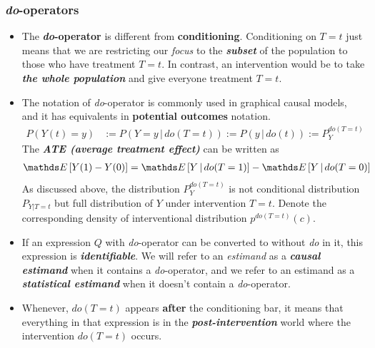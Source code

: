 \documentclass[11pt]{article}
\begin{document}
\subsubsection{\emph{do}-operators}
\begin{itemize}
\item   The \textbf{\emph{do}-operator} is different from \textbf{conditioning}. Conditioning on $T = t$ just means that we are restricting our \emph{focus} to the \emph{\textbf{subset}} of the population to those who have treatment $T=t$. In contrast, an intervention would be to take \textbf{\emph{the whole population}} and give everyone treatment $T=t$.

\item The notation of \emph{do}-operator is commonly used in graphical causal models, and it has equivalents in \textbf{potential outcomes} notation.
\begin{align}
P(Y(t) = y) &:= P(Y = y \,|\, do(T = t)) := P(y \,|\, do(t)) := P_{Y}^{do(T=t)}  \label{eqn: do_dist}
\end{align} The \textbf{\emph{ATE (average treatment effect)}} can be written as 
\begin{align}
\E{}{Y(1) - Y(0)} &= \E{}{Y\,|\, do(T=1)} -  \E{}{Y\,|\, do(T=0)} \label{eqn: ate_do}
\end{align} As discussed above, the distribution $P_{Y}^{do(T=t)}$ is not conditional distribution $P_{Y|T=t}$ but full distribution of $Y$ under intervention $T=t$. Denote the corresponding density of interventional distribution $p^{do(T=t)}(c)$.



\item If an expression $Q$ with \emph{do}-operator can be converted to without \emph{do} in it, this expression is \textbf{\emph{identifiable}}.  We will refer to an
\emph{estimand} as a \emph{\textbf{causal estimand}} when it contains a \emph{do}-operator, and we refer to an estimand as a \emph{\textbf{statistical estimand}} when it doesn’t contain a \emph{do}-operator.

\item Whenever, $do(T=t)$ appears \textbf{after} the conditioning bar, it means that everything in that expression is in the \emph{\textbf{post-intervention}} world where the
intervention $do(T=t)$ occurs.  


\end{itemize}
\end{document}
